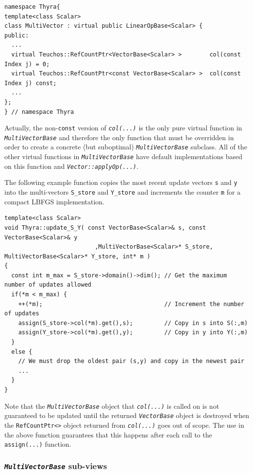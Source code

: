 \documentclass[pdf,ps2pdf,11pt]{SANDreport}
\begin{document}
{\scriptsize\begin{verbatim}
namespace Thyra{
template<class Scalar>
class MultiVector : virtual public LinearOpBase<Scalar> {
public:
  ...
  virtual Teuchos::RefCountPtr<VectorBase<Scalar> >        col(const Index j) = 0;
  virtual Teuchos::RefCountPtr<const VectorBase<Scalar> >  col(const Index j) const;
  ...
};
} // namespace Thyra
\end{verbatim}}

{}\noindent{}Actually, the non-\texttt{const} version of
{}\texttt{\textit{col(...)}}  is the only pure virtual function in
{}\texttt{\textit{Multi\-Vector\-Base}} and therefore the only function that
must be overridden in order to create a concrete (but suboptimal)
{}\texttt{\textit{Multi\-Vector\-Base}} subclass.  All of the other virtual
functions in {}\texttt{\textit{Multi\-Vector\-Base}} have default
implementations based on this function and
{}\texttt{\textit{Vector\-::applyOp(\-...)}}.

The following example function copies the most recent update vectors
{}\texttt{s} and {}\texttt{y} into the multi-vectors
{}\texttt{S\_store} and {}\texttt{Y\_store} and increments the counter
{}\texttt{m} for a compact LBFGS implementation.

{\scriptsize\begin{verbatim}
template<class Scalar>
void Thyra::update_S_Y( const VectorBase<Scalar>& s, const VectorBase<Scalar>& y
                          ,MultiVectorBase<Scalar>* S_store, MultiVectorBase<Scalar>* Y_store, int* m )
{
  const int m_max = S_store->domain()->dim(); // Get the maximum number of updates allowed
  if(*m < m_max) {
    ++(*m);                                   // Increment the number of updates
    assign(S_store->col(*m).get(),s);         // Copy in s into S(:,m)
    assign(Y_store->col(*m).get(),y);         // Copy in y into Y(:,m)
  }
  else {
    // We must drop the oldest pair (s,y) and copy in the newest pair
    ...
  }
}
\end{verbatim}}

{}\noindent{}Note that the {}\texttt{\textit{Multi\-Vector\-Base}} object
that {}\texttt{\textit{col(...)}} is called on is not guaranteed to be
updated until the returned {}\texttt{\textit{Vector\-Base}} object is
destroyed when the {}\texttt{RefCountPtr<>} object returned from
{}\texttt{\textit{col(...)}} goes out of scope.  The use in the above
function guarantees that this happens after each call to the
{}\texttt{assign(...)} function.

%
\subsubsection{\texttt{\textit{Multi\-Vector\-Base}} sub-views}
%
\end{document}
